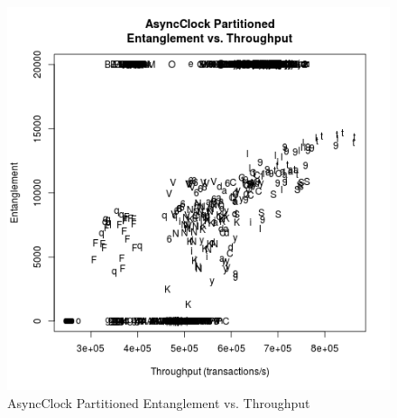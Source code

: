 \begin{figure}
\center
\includegraphics[height=.4\textheight]{async_partitioned_throughput_entanglement.png}
\caption{AsyncClock Partitioned Entanglement vs. Throughput}
\label{async_partitioned_throughput_entanglement}
\end{figure}

